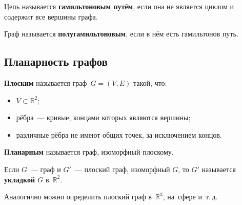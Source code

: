 Цепь называется \textbf{гамильтоновым путём}, если она не является циклом и содержит все вершины графа.

 Граф называется \textbf{полугамильтоновым}, если в нём есть гамильтонов путь.

\subsection{Планарность графов}
 \textbf{Плоским} называется граф~$G = (V, E)$ такой, что:
\begin{itemize}
	\item $V \subset \mathbb R^2$;
	\item рёбра~--- кривые, концами которых являются вершины;
	\item различные рёбра не имеют общих точек, за исключением концов.
\end{itemize}

 \textbf{Планарным} называется граф, изоморфный плоскому.

Если $G$~--- граф и $G'$~--- плоский граф, изоморфный $G$, то $G'$ называется \textbf{укладкой $G$} в~$\mathbb R^2$.

Аналогично можно определить плоский граф в~$\mathbb R^3$, на~сфере и~т.\,д.

